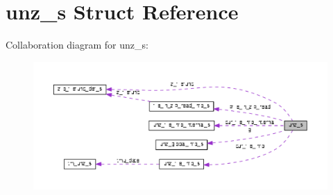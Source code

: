 \hypertarget{structunz__s}{}\section{unz\+\_\+s Struct Reference}
\label{structunz__s}


Collaboration diagram for unz\+\_\+s\+:\nopagebreak
\begin{figure}[H]
\begin{center}
\leavevmode
\includegraphics[width=350pt]{structunz__s__coll__graph}
\end{center}
\end{figure}
